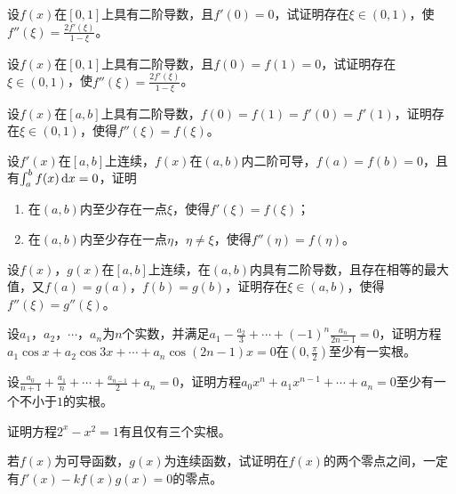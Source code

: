 \begin{example}
	设$f(x)$在$[0,1]$上具有二阶导数，且$f'(0)=0$，试证明存在$\xi\in(0,1)$，使$f''(\xi)=\frac{2f'(\xi)}{1-\xi}$。
\end{example}

\begin{example}
	设$f(x)$在$[0,1]$上具有二阶导数，且$f(0)=f(1)=0$，试证明存在$\xi\in(0,1)$，使$f''(\xi)=\frac{2f'(\xi)}{1-\xi}$。
\end{example}

\begin{example}
	设$f(x)$在$[a,b]$上具有二阶导数，$f(0)=f(1)=f'(0)=f'(1)$，证明存在$\xi\in(0,1)$，使得$f''(\xi)=f(\xi)$。
\end{example}

\begin{example}
	设$f'(x)$在$[a,b]$上连续，$f(x)$在$(a,b)$内二阶可导，$f(a)=f(b)=0$，且有$\int_{a}^{b}f(x)\,\mathrm{d} x=0$，证明
	\begin{enumerate}
		\item 在$(a,b)$内至少存在一点$\xi$，使得$f'(\xi)=f(\xi)$；
		\item 在$(a,b)$内至少存在一点$\eta$，$\eta\neq\xi$，使得$f''(\eta)=f(\eta)$。
	\end{enumerate}
\end{example}

\begin{example}
	设$f(x)$，$g(x)$在$[a,b]$上连续，在$(a,b)$内具有二阶导数，且存在相等的最大值，又$f(a)=g(a)$，$f(b)=g(b)$，证明存在$\xi\in(a,b)$，使得$f''(\xi)=g''(\xi)$。
\end{example}

\begin{example}
	设$a_1$，$a_2$，$\cdots$，$a_n$为$n$个实数，并满足$a_1-\frac{a_2}{3}+\cdots+(-1)^n\frac{a_n}{2n-1}=0$，证明方程$a_1\cos x+a_2\cos 3x+\cdots+a_n\cos (2n-1)x=0$在$(0,\frac{\pi}{2})$至少有一实根。
\end{example}

\begin{example}
	设$\frac{a_0}{n+1}+\frac{a_1}{n}+\cdots+\frac{a_{n-1}}{2}+a_n=0$，证明方程$a_0x^n+a_1x^{n-1}+\cdots+a_n=0$至少有一个不小于$1$的实根。
\end{example}

\begin{example}
	证明方程$2^x-x^2=1$有且仅有三个实根。
\end{example}

\begin{example}
	若$f(x)$为可导函数，$g(x)$为连续函数，试证明在$f(x)$的两个零点之间，一定有$f'(x)-kf(x)g(x)=0$的零点。
\end{example}

